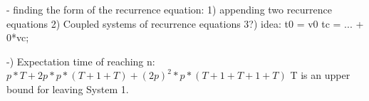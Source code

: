 - finding the form of the recurrence equation:
1) appending two recurrence equations
2) Coupled systems of recurrence equations
3?) idea: t0 = v0
tc = ... + 0*vc;

-) Expectation time of reaching n:
$p*T + 2p*p*(T+1+T) + (2p)^2*p*(T+1+T+1+T)$
T is an upper bound for leaving System 1.
